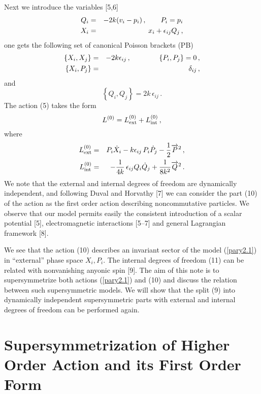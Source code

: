 \documentclass[a4paper,12pt]{article}
\begin{document}
Next we introduce the variables [5,6]
\begin{eqnarray}\label{pary2.6}
  Q_i &= & - 2k(v_i - p_i) \, ,  \qquad P_i = p_i
  \cr
  X_i &=  & x_i + \epsilon_{ij} Q_j \, ,
\end{eqnarray}
one gets the following set of canonical Poisson brackets (PB)
\begin{eqnarray}\label{pary2.7}
\left\{  X_i, X_j \right\} &= &  -2k \epsilon_{ij}\, ,
\qquad \qquad
  \left\{  P_i, P_j \right\}  =  0\, ,
  \cr
  \left\{  X_i, P_j \right\} &= &
  \delta_{ij}\, ,
\end{eqnarray}
and
\begin{equation}\label{pary2.8}
\left\{  Q_i, Q_j \right\} =  2k \, \epsilon_{ij}\, .
\end{equation}
The action (5) takes the form
\begin{equation}\label{pary2.9}
  L^{(0)}=  L^{(0)}_{\rm ext}  +       L^{(0)}_{\rm int}\, ,
\end{equation}
where
\begin{eqnarray}\label{pary2.10}
  L^{(0)}_{\rm ext}  &= & P_i \dot{X}_i 
   - k  \epsilon_{ij}
   \, P_i \dot{P}_j -
   \frac{1}{2} \overrightarrow{P}^2\, ,
   \\
      L^{(0)}_{\rm int}  &= & 
      - \frac{1}{4k}\, \epsilon_{ij} Q_i
\dot{Q}_j +
   \frac{1}{8k^2} \overrightarrow{Q}^2\, .
   \label{pary2.11}
\end{eqnarray}
We note that the external and internal degrees of freedom are
dynamically independent, and following Duval and Horvathy [7] we 
can consider  the part (10) of the action as the first order
action describing noncommutative particles. We observe that our 
 model permits easily the consistent  introduction of a scalar
 potential [5], electromagnetic interactions  [5--7] and general
 Lagrangian framework [8].

We see that the action (10) describes an invariant sector of the
model (\ref{pary2.1}) in ``external'' phase space $X_i, P_i$.
  The  internal degrees of freedom (11) can be  related with
 nonvanishing anyonic spin [9]. The aim of this note is to
 supersymmetrize both actions (\ref{pary2.1}) and (10) and discuss 
the relation
between such supersymmetric models. We will show that the split
(9) into dynamically independent supersymmetric
  parts with external and internal
degrees of freedom   can be performed again.


\section{Supersymmetrization of Higher
  Order Action and its First Order Form}
\end{document}
